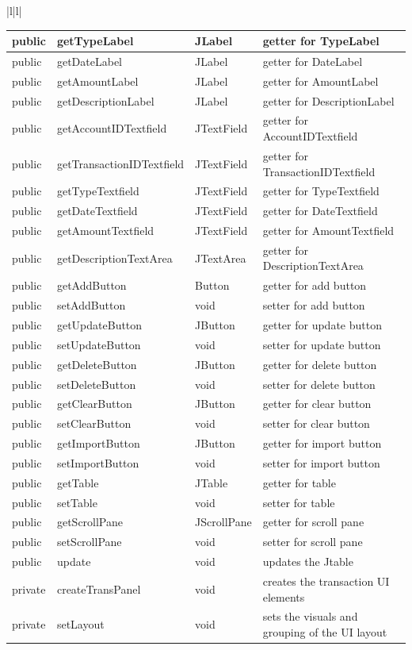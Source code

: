 \documentclass[12pt]{article}
\begin{document}
\begin{center}
\begin{tabular}{|l|l|}
\begin{tabular}{l|l|l|p{5cm}}
public &getTypeLabel &JLabel&getter for TypeLabel\\ \hline 
public &getDateLabel &JLabel&getter for DateLabel\\ \hline 
public &getAmountLabel &JLabel&getter for AmountLabel\\ \hline 
public &getDescriptionLabel&JLabel&getter for DescriptionLabel\\ \hline 
public &getAccountIDTextfield&JTextField&getter for AccountIDTextfield\\ \hline 
public &getTransactionIDTextfield&JTextField&getter for TransactionIDTextfield\\ \hline 
public &getTypeTextfield&JTextField&getter for TypeTextfield\\ \hline 
public &getDateTextfield&JTextField&getter for DateTextfield\\ \hline 
public &getAmountTextfield&JTextField&getter for AmountTextfield\\ \hline 
public &getDescriptionTextArea&JTextArea&getter for DescriptionTextArea\\ \hline 
public  &getAddButton&Button&getter for add button\\ \hline 
public  &setAddButton&void&setter for add button\\ \hline 
public  &getUpdateButton&JButton&getter for update button\\ \hline 
public  &setUpdateButton&void&setter for update button\\ \hline 
public  &getDeleteButton&JButton&getter for delete button\\ \hline 
public  &setDeleteButton&void&setter for delete button\\ \hline 
public  &getClearButton&JButton&getter for clear button\\ \hline 
public  &setClearButton&void&setter for clear button\\ \hline 
public  &getImportButton&JButton&getter for import button\\ \hline 
public  &setImportButton&void&setter for import button\\ \hline 
public  &getTable&JTable&getter for table\\ \hline 
public  &setTable&void&setter for table\\ \hline 
public  &getScrollPane&JScrollPane&getter for scroll pane\\ \hline 
public  &setScrollPane&void&setter for scroll pane\\ \hline 
public &update &void &updates the Jtable\\ \hline 
private &createTransPanel&void &creates the transaction UI elements\\ \hline 
private &setLayout &void &sets the visuals and grouping of the UI layout
\end{tabular} \\ \hline


\end{tabular}
\end{center}
\end{document}
